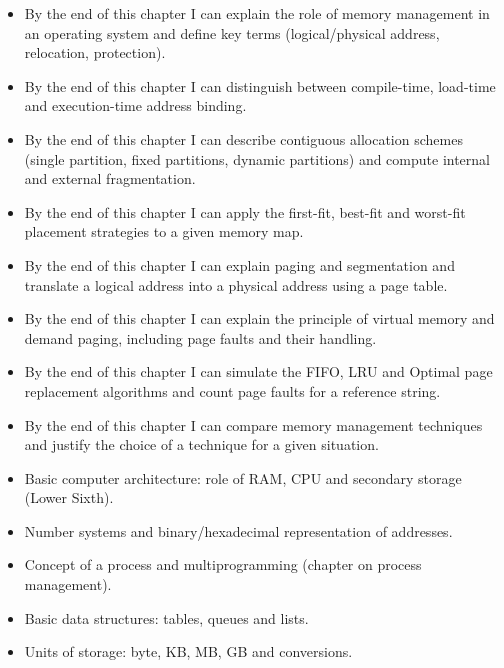 \documentclass[11pt]{article}
\begin{document}
\begin{objectifs}
\begin{itemize}
\item By the end of this chapter I can explain the role of memory management in an operating system and define key terms (logical/physical address, relocation, protection).
\item By the end of this chapter I can distinguish between compile-time, load-time and execution-time address binding.
\item By the end of this chapter I can describe contiguous allocation schemes (single partition, fixed partitions, dynamic partitions) and compute internal and external fragmentation.
\item By the end of this chapter I can apply the first-fit, best-fit and worst-fit placement strategies to a given memory map.
\item By the end of this chapter I can explain paging and segmentation and translate a logical address into a physical address using a page table.
\item By the end of this chapter I can explain the principle of virtual memory and demand paging, including page faults and their handling.
\item By the end of this chapter I can simulate the FIFO, LRU and Optimal page replacement algorithms and count page faults for a reference string.
\item By the end of this chapter I can compare memory management techniques and justify the choice of a technique for a given situation.
\end{itemize}
\end{objectifs}

\begin{prerequis}
\begin{itemize}
\item Basic computer architecture: role of RAM, CPU and secondary storage (Lower Sixth).
\item Number systems and binary/hexadecimal representation of addresses.
\item Concept of a process and multiprogramming (chapter on process management).
\item Basic data structures: tables, queues and lists.
\item Units of storage: byte, KB, MB, GB and conversions.
\end{itemize}
\end{prerequis}

\newpage
\end{document}
